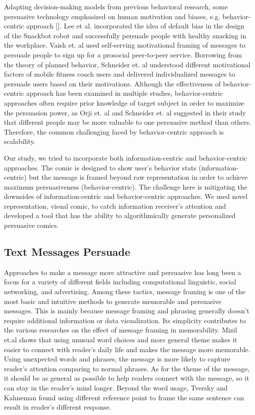 Adapting decision-making models from previous behavioral research, some persuasive technology emphasized on human motivation and biases, e.g. behavior-centric approach []. Lee et al. incorporated the idea of default bias in the design of the Snackbot robot and successfully persuade people with healthy snacking in the workplace. Vaish et. al used self-serving motivational framing of messages to persuade people to sign up for a prosocial peer-to-peer service. Borrowing from the theory of planned behavior, Schneider et. al understood different motivational factors of mobile fitness coach users and delivered individualized messages to persuade users based on their motivations. Although the effectiveness of behavior-centric approach has been examined in multiple studies, behavior-centric approaches often require prior knowledge of target subject in order to maximize the persuasion power, as Orji et. al and Schneider et. al suggested in their study that different people may be more valuable to one persuasive method than others.  Therefore, the common challenging faced by behavior-centric approach is scalability.\par

Our study, we tried to incorporate both information-centric and behavior-centric approaches. The comic is designed to show user's behavior stats (information-centric) but the message is framed beyond raw representation in order to achieve maximum persuasiveness (behavior-centric). The challenge here is mitigating the downsides of information-centric and behavior-centric approaches. We used novel representation, visual comic, to catch information receiver's attention and developed a tool that has the ability to algorithmically generate personalized persuasive comics.
\par

\subsection{Text Messages Persuade}
Approaches to make a message more attractive and persuasive has long been a focus for a variety of different fields including computational linguistic, social networking, and advertising. Among these tactics, message framing is one of the most basic and intuitive methods to generate memorable and persuasive messages. This is mainly because message framing and phrasing generally doesn't require additional information or data visualization. Its simplicity contributes to the various researches on the effect of message framing in memorability. Mizil et.al shows that using unusual word choices and more general theme makes it easier to connect with reader's daily life and makes the message more memorable. Using unexpected words and phrases, the message is more likely to capture reader's attention comparing to normal phrases. As for the theme of the message, it should be as general as possible to help readers connect with the message, so it can stay in the reader's mind longer. Beyond the word usage, Tversky and Kahneman found using different reference point to frame the same sentence can result in reader's different response.\par

